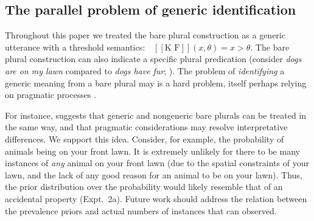 \documentclass[12pt,letterpaper]{article}
\newcommand{\denote}[1]{\mbox{ $[\![ #1 ]\!]$}}
\newcommand{\mht}[1]{\textcolor{Blue}{[mht: #1]}}
\begin{document}

\subsection*{The parallel problem of generic identification}

Throughout this paper we treated the bare plural construction as a generic utterance with a threshold semantics: $\denote{\text{K F}}(x, \theta)=x>\theta$.
The bare plural construction can also indicate a specific plural predication (consider \emph{dogs are on my lawn} compared to \emph{dogs have fur};  ).
The problem of \emph{identifying} a generic meaning from a bare plural may is a hard problem, itself perhaps relying on pragmatic processes \cite{Cimpian2008, Declerck1991}. 

For instance,  suggests that generic and nongeneric bare plurals can be treated in the same way, and that pragmatic considerations may resolve interpretative differences. 
We support this idea.
Consider, for example, the probability of animals being on your front lawn. 
It is extremely unlikely for there to be many instances of \emph{any} animal on your front lawn (due to the spatial constraints of your lawn, and the lack of any good reason for an animal to be on your lawn). 
Thus, the prior distribution over the probability would likely resemble that of an accidental property (Expt.~2a).
Future work should address the relation between the prevalence priors and actual numbers of instances that can observed.


\end{document}
